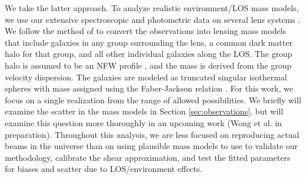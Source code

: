 We take the latter approach. To analyze realistic environment/LOS mass models, we use our extensive spectroscopic and photometric data on several lens systems \citep{Wong11}. We follow the method of \citet{Wong11} to convert the observations into lensing mass models that include galaxies in any group surrounding the lens, a common dark matter halo for that group, and all other individual galaxies along the LOS. The group halo is assumed to be an NFW profile \citep{Navarro96}, and the mass is derived from the group velocity dispersion. The galaxies are modeled as truncated singular isothermal spheres with mass assigned using the Faber-Jackson relation \citep{Faber76}. For this work, we focus on a single realization from the range of allowed possibilities. We briefly will examine the scatter in the mass models in Section \ref{sec:observations}, but will examine this question more thoroughly in an upcoming work (Wong et al. in preparation). Throughout this analysis, we are less focused on reproducing actual beams in the universe than on using plausible mass models to use to validate our methodology, calibrate the shear approximation, and test the fitted parameters for biases and scatter due to LOS/environment effects.
  
  